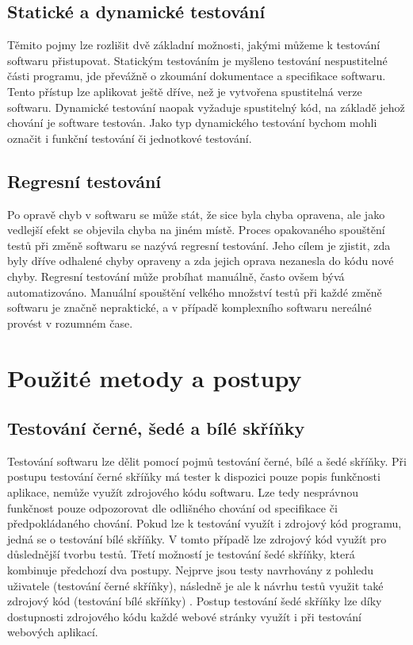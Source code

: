 \documentclass[
    color,   %
	table,   %
    twoside, %
]{fithesis3}
\begin{document}
  \subsection{Statické a dynamické testování}
  Těmito pojmy lze rozlišit dvě základní možnosti, jakými můžeme k testování softwaru přistupovat. Statickým testováním je myšleno testování nespustitelné části programu, jde převážně o zkoumání dokumentace a specifikace softwaru. Tento přístup lze aplikovat ještě dříve, než je vytvořena spustitelná verze softwaru. Dynamické testování naopak vyžaduje spustitelný kód, na základě jehož chování je software testován. \cite{Patton} Jako typ dynamického testování bychom mohli označit i funkční testování či jednotkové testování.
  
  \subsection{Regresní testování}
  Po opravě chyb v softwaru se může stát, že sice byla chyba opravena, ale jako vedlejší efekt se objevila chyba na jiném místě. Proces opakovaného spouštění testů při změně softwaru se nazývá regresní testování. Jeho cílem je zjistit, zda byly dříve odhalené chyby opraveny a zda jejich oprava nezanesla do kódu nové chyby. Regresní testování může probíhat manuálně, často ovšem bývá automatizováno. Manuální spouštění velkého množství testů při každé změně softwaru je značně nepraktické, a v případě komplexního softwaru nereálné provést v rozumném čase. \cite{RegresISTQB}
  
  \section{Použité metody a postupy}
  \subsection{Testování černé, šedé a bílé skříňky}
  Testování softwaru lze dělit pomocí pojmů testování černé, bílé a šedé skříňky. Při postupu testování černé skříňky má tester k dispozici pouze popis funkčnosti aplikace, nemůže využít zdrojového kódu softwaru. Lze tedy nesprávnou funkčnost pouze odpozorovat dle odlišného chování od specifikace či předpokládaného chování. Pokud lze k testování využít i zdrojový kód programu, jedná se o testování bílé skříňky. V tomto případě lze zdrojový kód využít pro důslednější tvorbu testů. Třetí možností je testování šedé skříňky, která kombinuje předchozí dva postupy. Nejprve jsou testy navrhovány z pohledu uživatele (testování černé skříňky), následně je ale k návrhu testů využit také zdrojový kód (testování bílé skříňky) \cite{Page}. Postup testování šedé skříňky lze díky dostupnosti zdrojového kódu každé webové stránky využít i při testování webových aplikací.
  
\end{document}
